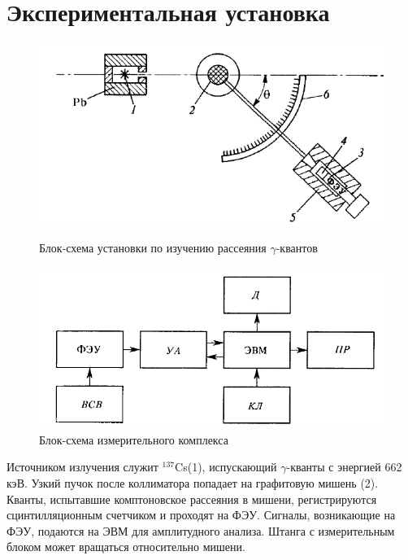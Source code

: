\documentclass[a4paper, 12pt]{article}%
\begin{document}
\section{Экспериментальная установка}

        \begin{figure}[h]
\begin{center}
\begin{minipage}[h]{0.48\linewidth}
\includegraphics[width=1\linewidth]{fig2.PNG}
\caption{Блок-схема установки по изучению рассеяния $\gamma$-квантов} %
\end{minipage}
\hfill 
\begin{minipage}[h]{0.48\linewidth}
\includegraphics[width=1\linewidth]{fig3.PNG}
\caption{Блок-схема измерительного комплекса}
\label{ris:experimcoded}
\end{minipage}
\end{center}
\end{figure}

Источником излучения служит $^{137}$Cs(1), испускающий  $\gamma$-кванты с энергией 662 кэВ. Узкий пучок после коллиматора попадает на графитовую мишень (2). Кванты, испытавшие комптоновское рассеяния в мишени, регистрируются сцинтилляционным счетчиком и проходят на ФЭУ. Сигналы, возникающие на ФЭУ, подаются на ЭВМ для амплитудного анализа. Штанга с измерительным блоком может вращаться относительно мишени.
\end{document}
